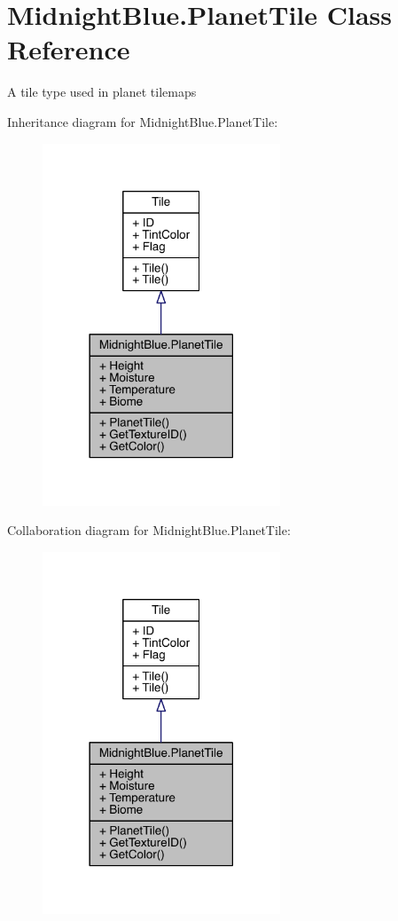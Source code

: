\hypertarget{class_midnight_blue_1_1_planet_tile}{}\section{Midnight\+Blue.\+Planet\+Tile Class Reference}
\label{class_midnight_blue_1_1_planet_tile}


A tile type used in planet tilemaps  




Inheritance diagram for Midnight\+Blue.\+Planet\+Tile\+:\nopagebreak
\begin{figure}[H]
\begin{center}
\leavevmode
\includegraphics[width=201pt]{class_midnight_blue_1_1_planet_tile__inherit__graph}
\end{center}
\end{figure}


Collaboration diagram for Midnight\+Blue.\+Planet\+Tile\+:\nopagebreak
\begin{figure}[H]
\begin{center}
\leavevmode
\includegraphics[width=201pt]{class_midnight_blue_1_1_planet_tile__coll__graph}
\end{center}
\end{figure}
